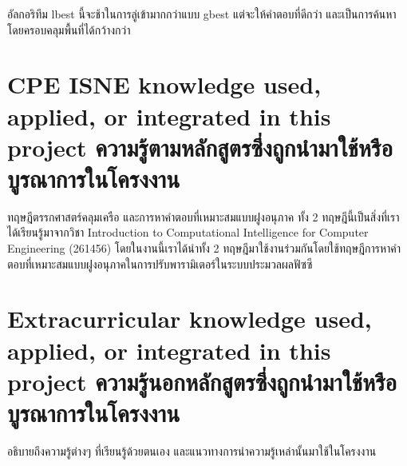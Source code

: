 อัลกอริทึม lbest นี้จะช้าในการลู่เข้ามากกว่าแบบ gbest แต่จะให้คำตอบที่ดีกว่า และเป็นการค้นหาโดยครอบคลุมพื้นที่ได้กว้างกว่า

\section{\ifenglish%
\ifcpe CPE \else ISNE \fi knowledge used, applied, or integrated in this project
\else%
ความรู้ตามหลักสูตรซึ่งถูกนำมาใช้หรือบูรณาการในโครงงาน
\fi
}

ทฤษฎีตรรกศาสตร์คลุมเครือ และการหาคำตอบที่เหมาะสมแบบฝูงอนุภาค ทั้ง 2 ทฤษฎีนี้เป็นสิ่งที่เราได้เรียนรู้มาจากวิชา Introduction to Computational Intelligence for Computer Engineering (261456) โดยในงานนี้เราได้นำทั้ง 2 ทฤษฎีมาใช้งานร่วมกันโดยใช้ทฤษฎีการหาคำตอบที่เหมาะสมแบบฝูงอนุภาคในการปรับพารามิเตอร์ในระบบประมวลผลฟัซซี

\section{\ifenglish%
Extracurricular knowledge used, applied, or integrated in this project
\else%
ความรู้นอกหลักสูตรซึ่งถูกนำมาใช้หรือบูรณาการในโครงงาน
\fi
}

อธิบายถึงความรู้ต่างๆ ที่เรียนรู้ด้วยตนเอง และแนวทางการนำความรู้เหล่านั้นมาใช้ในโครงงาน
